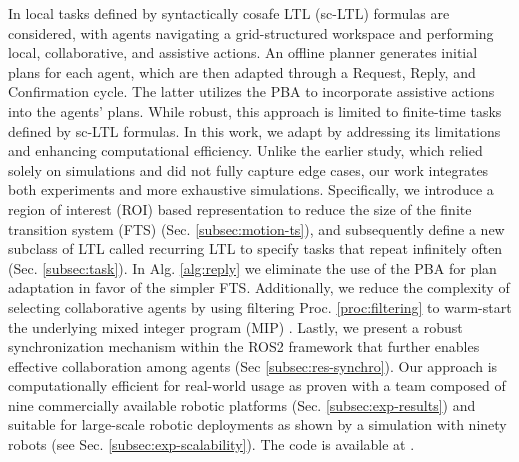 \par In \cite{meng_paper} local tasks defined by syntactically cosafe LTL (sc-LTL) formulas \cite{scLTL} are considered, with agents navigating a grid-structured workspace and performing local, collaborative, and assistive actions. An offline planner generates initial plans for each agent, which are then adapted through a Request, Reply, and Confirmation cycle. The latter utilizes the PBA to incorporate assistive actions into the agents' plans. While robust, this approach is limited to finite-time tasks defined by sc-LTL formulas. In this work, we adapt \cite{meng_paper} by addressing its limitations and enhancing computational efficiency. Unlike the earlier study, which relied solely on simulations and did not fully capture edge cases, our work integrates both experiments and more exhaustive simulations. Specifically, we introduce a region of interest (ROI) based representation to reduce the size of the finite transition system (FTS) \cite{model-checking} (Sec. \ref{subsec:motion-ts}), and subsequently define a new subclass of LTL called recurring LTL to specify tasks that repeat infinitely often (Sec. \ref{subsec:task}). In Alg. \ref{alg:reply}  we eliminate the use of the PBA for plan adaptation in favor of the simpler FTS. Additionally, we reduce the complexity of selecting collaborative agents by using filtering Proc. \ref{proc:filtering} to warm-start the underlying mixed integer program (MIP) \cite{mip}. Lastly, we present a robust synchronization mechanism within the ROS2 \cite{ros2} framework that further enables effective collaboration among agents (Sec \ref{subsec:res-synchro}). Our approach is computationally efficient for real-world usage as proven with a team composed of nine commercially available robotic platforms (Sec. \ref{subsec:exp-results}) and suitable for large-scale robotic deployments as shown by a simulation with ninety robots (see Sec. \ref{subsec:exp-scalability}). The code is available at \cite{repo}.


